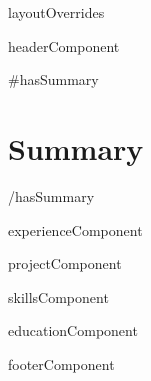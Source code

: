 \documentclass[letterpaper,11pt]{article}
\begin{document}
{{{layoutOverrides}}}

{{{headerComponent}}}

{{#hasSummary}}
\section{Summary}
\vspace{2pt}
\small{}
{{/hasSummary}}

{{{experienceComponent}}}

{{{projectComponent}}}

{{{skillsComponent}}}

{{{educationComponent}}}

{{{footerComponent}}}
\end{document}

